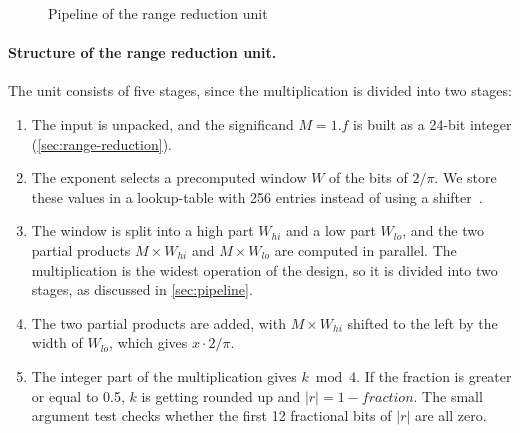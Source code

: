\begin{figure}[H]
{%
  }
  \caption{Pipeline of the range reduction unit}
  \label{fig:range-reduction-unit}
\end{figure}

\paragraph{Structure of the range reduction unit.}
\label{pa:rru-struc}

The unit consists of five stages, since the multiplication is divided into two stages:
\begin{enumerate}[label=\textbf{Stage \arabic*.}, ref=\arabic*, leftmargin=*]
  \item The input is unpacked, and the significand $M = 1.f$ is built as a 24-bit integer (\cref{sec:range-reduction}).
  \item The exponent selects a precomputed window $W$ of the bits of $2/\pi$. We store
    these values in a lookup-table with 256 entries instead of using a shifter~\cite{ly2026payne}.
  \item[\textbf{Stage 3a.}] The window is split into a high part $W_{hi}$ and a low part $W_{lo}$, and the
    two partial products $M \times W_{hi}$ and $M \times W_{lo}$ are computed in parallel. The
    multiplication is the widest operation of the design, so it is divided into two stages, as
    discussed in \cref{sec:pipeline}.
  \item[\textbf{Stage 3b.}] The two partial products are added, with $M \times W_{hi}$ shifted to the
    left by the width of $W_{lo}$, which gives $x \cdot 2/\pi$.
  \item[\textbf{Stage 4.}] The integer part of the multiplication gives $k \bmod 4$. If the fraction is greater
    or equal to 0.5, $k$ is getting rounded up and $|r| = 1 - fraction$. The small argument
    test checks whether the first 12 fractional bits of $|r|$ are all zero.
\end{enumerate}

